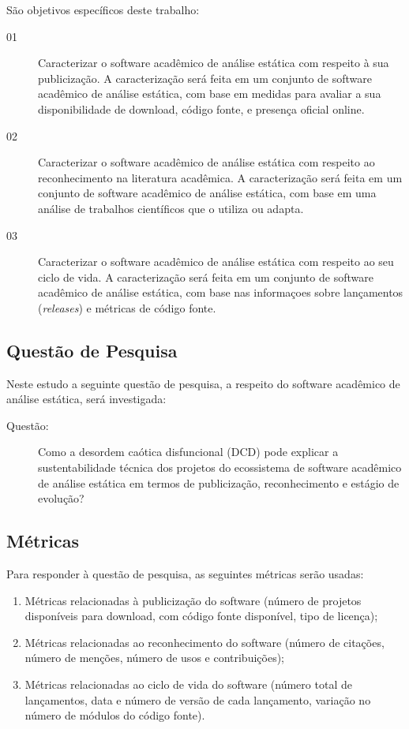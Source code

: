 São objetivos específicos deste trabalho:

\begin{description}
  \item [01]
    Caracterizar o software acadêmico de análise estática com respeito à sua
    publicização.
    A caracterização será feita em um conjunto de software acadêmico de análise
    estática, com base em medidas para avaliar a sua disponibilidade de
    download, código fonte, e presença oficial online.
  \item [02]
    Caracterizar o software acadêmico de análise estática com respeito ao
    reconhecimento na literatura acadêmica.
    A caracterização será feita em um conjunto de software acadêmico de análise
    estática, com base em uma análise de trabalhos científicos que o utiliza ou
    adapta.
  \item [03]
    Caracterizar o software acadêmico de análise estática com respeito ao
    seu ciclo de vida.
    A caracterização será feita em um conjunto de software acadêmico de análise
    estática, com base nas informaçoes sobre lançamentos ({\it releases}) e
    métricas de código fonte.
\end{description}

\subsection{Questão de Pesquisa}

\newcommand{\QuestaoGeralUm}{
  Como a desordem caótica disfuncional (DCD) pode explicar a sustentabilidade técnica
  dos projetos do ecossistema de software acadêmico de análise estática em
  termos de publicização, reconhecimento e estágio de evolução?
}

Neste estudo a seguinte questão de pesquisa, a respeito do software acadêmico
de análise estática, será investigada:

\begin{description}
  \item [Questão:] \QuestaoGeralUm
\end{description}

\subsection{Métricas}

Para responder à questão de pesquisa, as seguintes métricas serão usadas:

\begin{enumerate}
  \item Métricas relacionadas à publicização do software (número de projetos
  disponíveis para download, com código fonte disponível, tipo de licença);

  \item Métricas relacionadas ao reconhecimento do software (número de
  citações, número de menções, número de usos e contribuições);

  \item Métricas relacionadas ao ciclo de vida do software (número total de
  lançamentos, data e número de versão de cada lançamento, variação no número
  de módulos do código fonte).
\end{enumerate}

